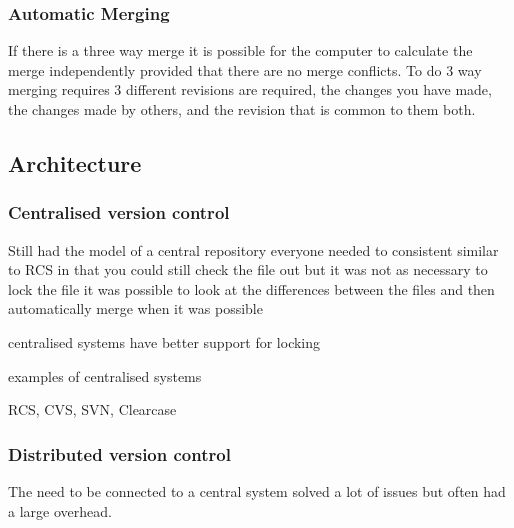 \subsubsection{Automatic Merging}
If there is a three way merge it is possible for the computer to calculate the merge independently provided that there are no merge conflicts.
To do 3 way merging requires 3 different revisions are required, the changes you have made, the changes made by others, and the revision that is common to them both.


% 

\subsection{Architecture}
\subsubsection{Centralised version control}
Still had the model of a central repository everyone needed to consistent
similar to RCS in that you could still check the file out but it was not as necessary to lock the file
it was possible to look at the differences between the files and then automatically merge when it was possible

centralised systems have better support for locking  

examples of centralised systems

RCS, CVS, SVN, Clearcase

\subsubsection{Distributed version control}
The need to be connected to a central system solved a lot of issues but often had a large overhead.  

